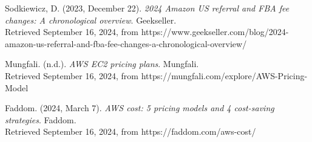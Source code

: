 \documentclass[12pt]{ctexart}
\begin{document}
\begin{thebibliography}{99}
     Sodkiewicz, D. (2023, December 22). \textit{2024 Amazon US referral and FBA fee changes: A chronological overview}. Geekseller. \\ Retrieved September 16, 2024, from https://www.geekseller.com/blog/2024-amazon-us-referral-and-fba-fee-changes-a-chronological-overview/

     Mungfali. (n.d.). \textit{AWS EC2 pricing plans}. Mungfali.  \\ Retrieved September 16, 2024, from https://mungfali.com/explore/AWS-Pricing-Model

     Faddom. (2024, March 7). \textit{AWS cost: 5 pricing models and 4 cost-saving strategies}. Faddom. \\ Retrieved September 16, 2024, from https://faddom.com/aws-cost/
    
\end{thebibliography}


\end{document}
